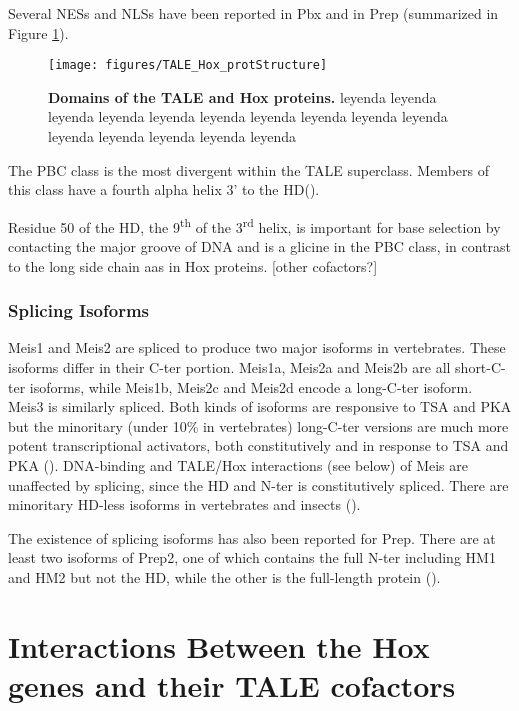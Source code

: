 Several \acp{NES} and \acp{NLS} have been reported in Pbx and in Prep (summarized in Figure \ref{fig:TALE_Hox_protStructure}).

\begin{figure}[]
  
  \centering
  \texttt{[image: figures/TALE\_Hox\_protStructure]}
  \caption[Domains of the TALE and Hox proteins]{\textbf{Domains of the TALE and Hox proteins.} leyenda leyenda leyenda leyenda leyenda leyenda leyenda leyenda leyenda leyenda leyenda leyenda leyenda leyenda leyenda}
  \label{fig:TALE_Hox_protStructure}
\end{figure}

The PBC class is the most divergent within the \ac{TALE} superclass. Members of this class have a fourth alpha helix 3' to the \ac{HD}(\cite{Mukherjee2007}). 

Residue 50 of the \ac{HD}, the 9\textsuperscript{th} of the 3\textsuperscript{rd} helix, is important for base selection by contacting the major groove of DNA and is a glicine in the PBC class, in contrast to the long side chain \acp{aa} in Hox proteins. [other cofactors?]


\subsubsection{Splicing Isoforms}

Meis1 and Meis2 are spliced to produce two major isoforms in vertebrates. These isoforms differ in their \ac{C-ter} portion. Meis1a, Meis2a and Meis2b are all short-\ac{C-ter} isoforms, while Meis1b, Meis2c and Meis2d encode a long-\ac{C-ter} isoform. Meis3 is similarly spliced. Both kinds of isoforms are responsive to \ac{TSA} and \ac{PKA} but the minoritary (under 10\% in vertebrates) long-\ac{C-ter} versions are much more potent transcriptional activators, both constitutively and in response to \ac{TSA} and \ac{PKA} (\cite{Huang2005, Irimia2011}). DNA-binding and TALE/Hox interactions (see below) of Meis are unaffected by splicing, since the \ac{HD} and \ac{N-ter} is constitutively spliced. There are minoritary \ac{HD}-less isoforms in vertebrates and insects (\cite{Irimia2011}). 

The existence of splicing isoforms has also been reported for Prep. There are at least two isoforms of Prep2, one of which contains the full \ac{N-ter} including HM1 and HM2 but not the \ac{HD}, while the other is the full-length protein (\cite{Haller2004}).

\section{Interactions Between the Hox genes and their TALE cofactors}
\label{sec:interactions}

